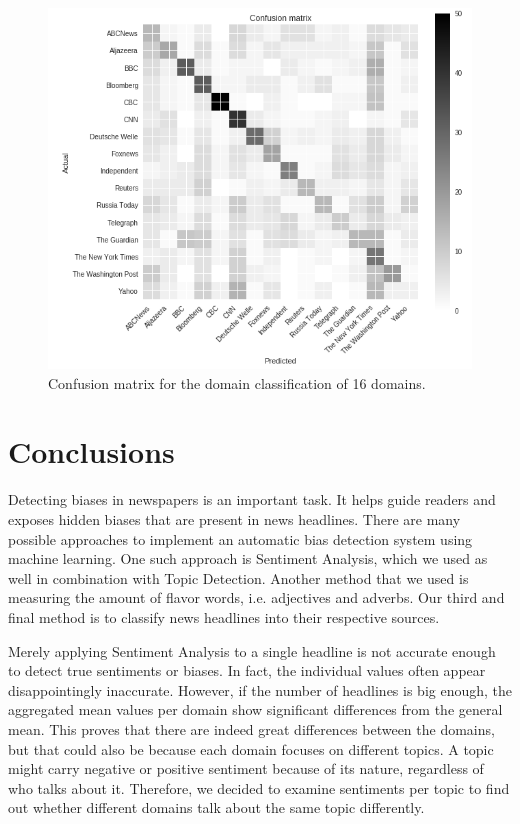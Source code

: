 \documentclass[final]{ieee}
\begin{document}
\begin{figure}[!hbt]
  \centering
    \includegraphics[width=\columnwidth]{classificationConfusionMatrix2.png}
    \caption{Confusion matrix for the domain classification of 16 domains.}
  \label{fig:classificationConfusionMatrix2}
\end{figure}

\section{Conclusions}\label{sec:conclusions}

Detecting biases in newspapers is an important task. It helps guide readers and exposes hidden biases that are present in news headlines. There are many possible approaches to implement an automatic bias detection system using machine learning. One such approach is Sentiment Analysis, which we used as well in combination with Topic Detection. Another method that we used is measuring the amount of flavor words, i.e. adjectives and adverbs. Our third and final method is to classify news headlines into their respective sources.

Merely applying Sentiment Analysis to a single headline is not accurate enough to detect true sentiments or biases. In fact, the individual values often appear disappointingly inaccurate. However, if the number of headlines is big enough, the aggregated mean values per domain show significant differences from the general mean. This proves that there are indeed great differences between the domains, but that could also be because each domain focuses on different topics. A topic might carry negative or positive sentiment because of its nature, regardless of who talks about it. Therefore, we decided to examine sentiments per topic to find out whether different domains talk about the same topic differently.
\end{document}
